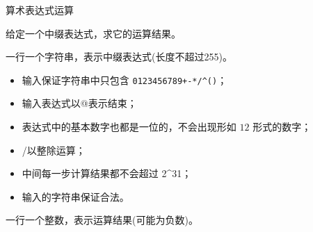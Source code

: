 算术表达式运算

给定一个中缀表达式，求它的运算结果。

一行一个字符串，表示中缀表达式(长度不超过255)。

\begin{itemize}
    \item 输入保证字符串中只包含 \texttt{0123456789+-*/^()}；
    \item 输入表达式以@表示结束；
    \item 表达式中的基本数字也都是一位的，不会出现形如 $12$ 形式的数字；
    \item /以整除运算；
    \item 中间每一步计算结果都不会超过 2^{31}；
    \item 输入的字符串保证合法。
\end{itemize}

一行一个整数，表示运算结果(可能为负数)。

